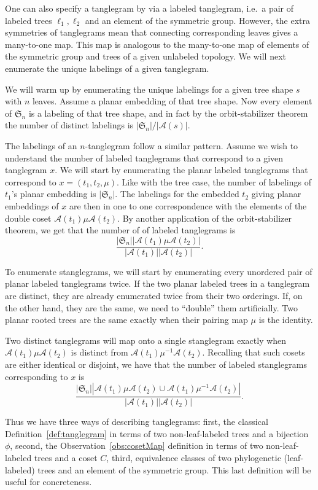 \documentclass{amsart}
\newcommand{\fS}{\mathfrak S}
\newcommand{\aut}{\mathcal A}
\newcommand{\pairing}{\mu}
\begin{document}
One can also specify a tanglegram by via a labeled tanglegram, i.e.\ a pair of labeled trees $\ell_1, \ell_2$ and an element of the symmetric group.
However, the extra symmetries of tanglegrams mean that connecting corresponding leaves gives a many-to-one map.
This map is analogous to the many-to-one map of elements of the symmetric group and trees of a given unlabeled topology.
We will next enumerate the unique labelings of a given tanglegram.

We will warm up by enumerating the unique labelings for a given tree shape $s$ with $n$ leaves.
Assume a planar embedding of that tree shape.
Now every element of $\fS_n$ is a labeling of that tree shape, and in fact by the orbit-stabilizer theorem the number of distinct labelings is $|\fS_n| / |\aut(s)|$.

The labelings of an $n$-tanglegram follow a similar pattern.
Assume we wish to understand the number of labeled tanglegrams that correspond to a given tanglegram $x$.
We will start by enumerating the planar labeled tanglegrams that correspond to $x = (t_1, t_2, \pairing)$.
Like with the tree case, the number of labelings of $t_1$'s planar embedding is $|\fS_n|$.
The labelings for the embedded $t_2$ giving planar embeddings of $x$ are then in one to one correspondence with the elements of the double coset $\aut(t_1) \pairing \aut(t_2)$.
By another application of the orbit-stabilizer theorem, we get that the number of of labeled tanglegrams is
\[
\frac{|\fS_n| |\aut(t_1) \pairing \aut(t_2)|}{|\aut(t_1)||\aut(t_2)|}.
\]

To enumerate stanglegrams, we will start by enumerating every unordered pair of planar labeled tanglegrams twice.
If the two planar labeled trees in a tanglegram are distinct, they are already enumerated twice from their two orderings.
If, on the other hand, they are the same, we need to ``double'' them artificially.
Two planar rooted trees are the same exactly when their pairing map $\pairing$ is the identity.

Two distinct tanglegrams will map onto a single stanglegram exactly when $\aut(t_1) \pairing \aut(t_2)$ is distinct from $\aut(t_1) \pairing^{-1} \aut(t_2)$.
Recalling that such cosets are either identical or disjoint, we have that the number of labeled stanglegrams corresponding to $x$ is
\[
\frac{|\fS_n| |\aut(t_1) \pairing \aut(t_2) \cup \aut(t_1) \pairing^{-1} \aut(t_2)|}{|\aut(t_1)||\aut(t_2)|}.
\]

Thus we have three ways of describing tanglegrams:
first, the classical Definition~\ref{def:tanglegram} in terms of two non-leaf-labeled trees and a bijection $\phi$,
second, the Observation~\ref{obs:cosetMap} definition in terms of two non-leaf-labeled trees and a coset $C$,
third, equivalence classes of two phylogenetic (leaf-labeled) trees and an element of the symmetric group.
This last definition will be useful for concreteness.
\end{document}
